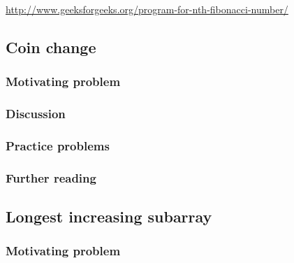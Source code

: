 \begin{itemize}
\url{http://www.geeksforgeeks.org/program-for-nth-fibonacci-number/}
\end{itemize}

\subsection{Coin change}

\subsubsection*{Motivating problem}







\subsubsection*{Discussion}

\subsubsection*{Practice problems}

\subsubsection*{Further reading}

\subsection{Longest increasing subarray}

\subsubsection*{Motivating problem}






